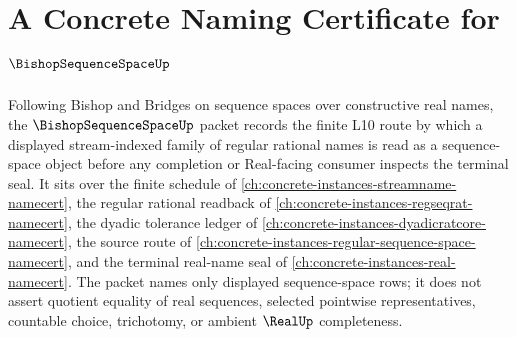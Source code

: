 \chapter{A Concrete Naming Certificate for $\BishopSequenceSpaceUp$}
\label{ch:concrete-instances-bishop-sequence-space-namecert}

Following Bishop and Bridges on sequence spaces over constructive real names, the $\BishopSequenceSpaceUp$ packet records the finite L10 route by which a displayed stream-indexed family of regular rational names is read as a sequence-space object before any completion or Real-facing consumer inspects the terminal seal. It sits over the finite schedule of \autoref{ch:concrete-instances-streamname-namecert}, the regular rational readback of \autoref{ch:concrete-instances-regseqrat-namecert}, the dyadic tolerance ledger of \autoref{ch:concrete-instances-dyadicratcore-namecert}, the source route of \autoref{ch:concrete-instances-regular-sequence-space-namecert}, and the terminal real-name seal of \autoref{ch:concrete-instances-real-namecert}. The packet names only displayed sequence-space rows; it does not assert quotient equality of real sequences, selected pointwise representatives, countable choice, trichotomy, or ambient $\RealUp$ completeness.

